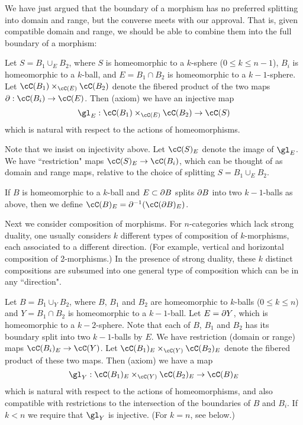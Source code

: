 We have just argued that the boundary of a morphism has no preferred splitting into
domain and range, but the converse meets with our approval.
That is, given compatible domain and range, we should be able to combine them into
the full boundary of a morphism:

{Let $S = B_1 \cup_E B_2$, where $S$ is homeomorphic to a $k$-sphere ($0\le k\le n-1$),
$B_i$ is homeomorphic to a $k$-ball, and $E = B_1\cap B_2$ is homeomorphic to  a $k{-}1$-sphere.
Let $\cC(B_1) \times_{\cC(E)} \cC(B_2)$ denote the fibered product of the 
two maps $\bd: \cC(B_i)\to \cC(E)$.
Then (axiom) we have an injective map
\[
	\gl_E : \cC(B_1) \times_{\cC(E)} \cC(B_2) \to \cC(S)
\]
which is natural with respect to the actions of homeomorphisms.}

Note that we insist on injectivity above.
Let $\cC(S)_E$ denote the image of $\gl_E$.
We have ``restriction" maps $\cC(S)_E \to \cC(B_i)$, which can be thought of as
domain and range maps, relative to the choice of splitting $S = B_1 \cup_E B_2$.

If $B$ is homeomorphic to a $k$-ball and $E \subset \partial B$ splits $\partial B$ into two $k{-}1$-balls
as above, then we define $\cC(B)_E = \bd^{-1}(\cC(\bd B)_E)$.

Next we consider composition of morphisms.
For $n$-categories which lack strong duality, one usually considers
$k$ different types of composition of $k$-morphisms, each associated to a different direction.
(For example, vertical and horizontal composition of 2-morphisms.)
In the presence of strong duality, these $k$ distinct compositions are subsumed into 
one general type of composition which can be in any ``direction".

{Let $B = B_1 \cup_Y B_2$, where $B$, $B_1$ and $B_2$ are homeomorphic to $k$-balls ($0\le k\le n$)
and $Y = B_1\cap B_2$ is homeomorphic to a $k{-}1$-ball.
Let $E = \partial Y$, which is homeomorphic to a $k{-}2$-sphere.
Note that each of $B$, $B_1$ and $B_2$ has its boundary split into two $k{-}1$-balls by $E$.
We have restriction (domain or range) maps $\cC(B_i)_E \to \cC(Y)$.
Let $\cC(B_1)_E \times_{\cC(Y)} \cC(B_2)_E$ denote the fibered product of these two maps. 
Then (axiom) we have a map
\[
	\gl_Y : \cC(B_1)_E \times_{\cC(Y)} \cC(B_2)_E \to \cC(B)_E
\]
which is natural with respect to the actions of homeomorphisms, and also compatible with restrictions
to the intersection of the boundaries of $B$ and $B_i$.
If $k < n$ we require that $\gl_Y$ is injective.
(For $k=n$, see below.)}

